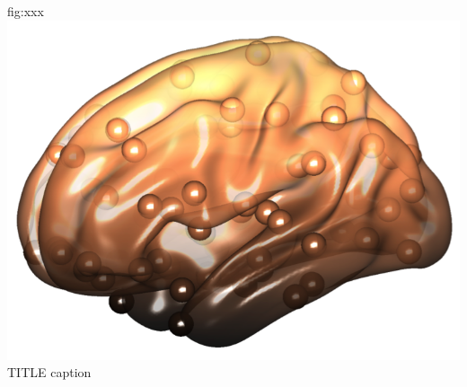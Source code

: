 \documentclass{tufte-handout}
\begin{document}
	{fig:xxx}
	{\includegraphics{tut_ba/fig1.png}}
	{TITLE}
	{
	caption
	}
\end{document}
